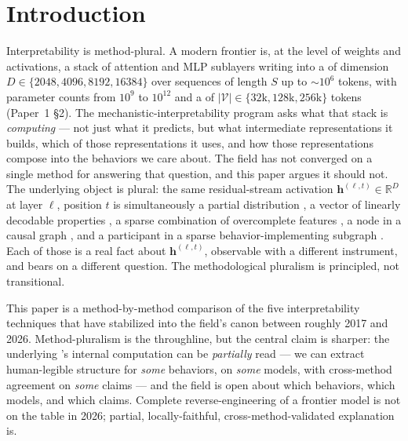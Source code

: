 
\section{Introduction}
\label{sec:introduction}

Interpretability is method-plural. A modern frontier  is, at
the level of weights and activations, a stack of attention and MLP
sublayers writing into a  of dimension $D \in \{2048,
4096, 8192, 16384\}$ over sequences of length $S$ up to $\sim10^6$
tokens, with parameter counts from $10^9$ to $10^{12}$ and a 
of $|\mathcal{V}| \in \{32\text{k}, 128\text{k}, 256\text{k}\}$ tokens
(Paper~1 \S2). The mechanistic-interpretability program asks what that
stack is \emph{computing} --- not just what it predicts, but what
intermediate representations it builds, which of those representations
it uses, and how those representations compose into the behaviors we
care about. The field has not converged on a single method for
answering that question, and this paper argues it should not. The
underlying object is plural: the same residual-stream activation
$\mathbf{h}^{(\ell, t)} \in \mathbb{R}^D$ at layer $\ell$, position
$t$ is simultaneously a partial  distribution
\citep{belrose2023-tuned-lens}, a vector of linearly decodable
properties \citep{marks-tegmark-2023-truth}, a sparse combination of
overcomplete features \citep{gao2024-topk-saes}, a node in a causal
graph \citep{meng2022-rome}, and a participant in a sparse
behavior-implementing subgraph \citep{wang2022-ioi}. Each of those is
a real fact about $\mathbf{h}^{(\ell, t)}$, observable with a
different instrument, and bears on a different question. The
methodological pluralism is principled, not transitional.

This paper is a method-by-method comparison of the five interpretability
techniques that have stabilized into the field's canon between roughly
2017 and 2026. Method-pluralism is the throughline, but the
central claim is sharper: the underlying 's internal
computation can be \emph{partially} read --- we can extract
human-legible structure for \emph{some} behaviors, on \emph{some}
models, with cross-method agreement on \emph{some} claims --- and the
field is open about which behaviors, which models, and which claims.
Complete reverse-engineering of a frontier model is not on the table
in 2026; partial, locally-faithful, cross-method-validated explanation
is.


